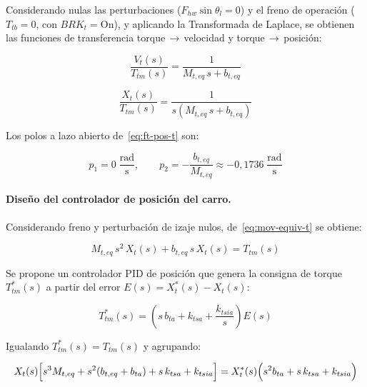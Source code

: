 \documentclass[12pt, a4paper]{article}
\begin{document}
Considerando nulas las perturbaciones ($F_{hw}\sin\theta_l = 0$) y el freno de operación
($T_{tb}=0$, con $BRK_t = \text{On}$), y aplicando la Transformada de Laplace, se
obtienen las funciones de transferencia torque\,$\to$\,velocidad y torque\,$\to$\,posición:

\begin{equation}
    \label{eq:ft-vel-t}
    \frac{V_t(s)}{T_{tm}(s)} = \frac{1}{M_{t,eq}\,s + b_{t,eq}}
\end{equation}

\begin{equation}
    \label{eq:ft-pos-t}
    \frac{X_t(s)}{T_{tm}(s)} = \frac{1}{s\!\left(M_{t,eq}\,s + b_{t,eq}\right)}
\end{equation}

Los polos a lazo abierto de~\eqref{eq:ft-pos-t} son:

\begin{equation}
    \label{eq:polos-LA-t}
    p_1 = 0\;\frac{\text{rad}}{\text{s}},
    \qquad
    p_2 = -\frac{b_{t,eq}}{M_{t,eq}} \approx -0{,}1736\;\frac{\text{rad}}{\text{s}}
\end{equation}

\paragraph{Diseño del controlador de posición del carro.}

Considerando freno y perturbación de izaje nulos, de~\eqref{eq:mov-equiv-t} se obtiene:

\begin{equation}
    M_{t,eq}\,s^2\,X_t(s) + b_{t,eq}\,s\,X_t(s) = T_{tm}(s)
\end{equation}

Se propone un controlador PID de posición que genera la consigna de torque
$T_{tm}^*(s)$ a partir del error $E(s) = X_t^*(s) - X_t(s)$:

\begin{equation}
    \label{eq:pid-t}
    T_{tm}^*(s) = \left(s\,b_{ta} + k_{tsa} + \frac{k_{tsia}}{s}\right)E(s)
\end{equation}

Igualando $T_{tm}^*(s) = T_{tm}(s)$ y agrupando:

\begin{equation}
\begin{split}
    X_t(s)\Bigl[s^3 M_{t,eq} + s^2(b_{t,eq}+b_{ta}) + s\,k_{tsa} + k_{tsia}\Bigr]
    = X_t^*(s)\Bigl(s^2 b_{ta} + s\,k_{tsa} + k_{tsia}\Bigr)
\end{split}
\end{equation}
\end{document}
